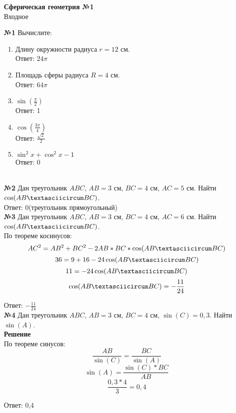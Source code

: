 


    \begin{center}
        \textbf{Сферическая геометрия №1}\\
        Входное
    \end{center}

    \textbf{№1}
    Вычислите:
    \begin{enumerate}
        \item Длину окружности радиуса $r = 12$ см.\\
        Ответ: $24\pi$

        \item Площадь сферы радиуса $R = 4$ см.\\
        Ответ: $64\pi$
        \
        \item $\sin\left(\frac{\pi}{2}\right)$\\
        Ответ: 1

        \item $\cos\left(\frac{3\pi}{4}\right)$\\
        Ответ: $\frac{\sqrt {2}}{2}$
        \item $\sin ^ 2 x + \cos ^ 2 x - 1$\\
        Ответ: 0
    \end{enumerate}\\


    \textbf{№2}
    Дан треугольник $ABC$, $AB = 3$ см, $BC = 4$ см, $AC = 5$ см.
    Найти $\cos(AB \textasciicircum BC)$.\\
    Ответ: 0(треугольник прямоугольный)\\


    \textbf{№3}
    Дан треугольник $ABC$, $AB = 3$ см, $BC = 4$ см, $AC = 6$ см.
    Найти $\cos(AB \textasciicircum BC)$.\\

    По теореме косинусов:
    \[  AC ^ 2 = AB ^ 2 + BC ^ 2 - 2 AB * BC * \cos(AB \textasciicircum BC) \]
    \[  36 = 9 + 16 - 24\cos(AB \textasciicircum BC) \]
    \[  11 = - 24\cos(AB \textasciicircum BC) \]
    \[ \cos(AB \textasciicircum BC)  = -\frac{11}{24}\]

    Ответ: $-\frac{11}{24}$\\


    \textbf{№4}
    Дан треугольник $ABC$, $AB = 3$ см, $BC = 4$ см, $\sin(C) = 0,3$.
    Найти $\sin(A)$.\\

    \textbf{Решение}\\

    По теореме синусов:
    \[
        \frac{AB}{\sin(C)} = \frac{BC}{\sin(A)}
    \]
    \[ \sin(A) = \frac{\sin(C)*BC}{AB} \]
    \[
        \frac{0,3 * 4}{3} = 0,4
    \]

    Ответ: 0,4



